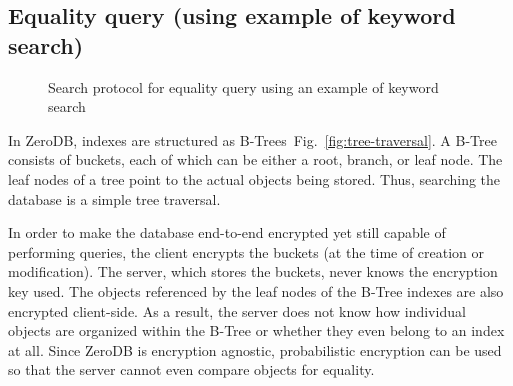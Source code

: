 \documentclass[notitlepage]{revtex4-1}
\newcommand{\figref}[1]{Fig.~\ref{#1}}
\begin{document}
\subsection{Equality query (using example of keyword search)}
\begin{figure}
	\begin{center}
        \qquad
	\end{center}
    \caption{Search protocol for equality query using an example of keyword search}
	\label{fig:btree-protocol}
\end{figure}

In ZeroDB, indexes are structured as B-Trees~\figref{fig:tree-traversal}.
A B-Tree consists of buckets, each of which can be either a root, branch, or leaf node.
The leaf nodes of a tree point to the actual objects being stored.
Thus, searching the database is a simple tree traversal.

In order to make the database end-to-end encrypted yet still capable of performing queries, the client encrypts the buckets (at the time of creation or modification).
The server, which stores the buckets, never knows the encryption key used.
The objects referenced by the leaf nodes of the B-Tree indexes are also encrypted client-side.
As a result, the server does not know how individual objects are organized within the B-Tree or whether they even belong to an index at all.
Since ZeroDB is encryption agnostic, probabilistic encryption can be used so that the server cannot even compare objects for equality.
\end{document}
